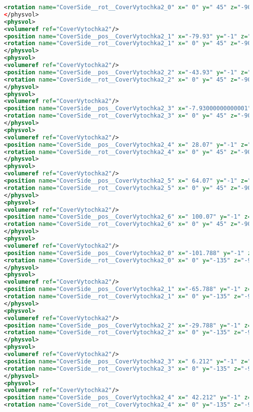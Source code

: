 \begin{lstlisting}[language=XML, firstline=1, lastline=89]
<rotation name="CoverSide__rot__CoverVytochka2_0" x=" 0" y=" 45" z="-90" unit="deg"/>
</physvol>
<physvol>
<volumeref ref="CoverVytochka2"/>
<position name="CoverSide__pos__CoverVytochka2_1" x="-79.93" y="-1" z=" 25.928" unit="mm"/>
<rotation name="CoverSide__rot__CoverVytochka2_1" x=" 0" y=" 45" z="-90" unit="deg"/>
</physvol>
<physvol>
<volumeref ref="CoverVytochka2"/>
<position name="CoverSide__pos__CoverVytochka2_2" x="-43.93" y="-1" z=" 25.928" unit="mm"/>
<rotation name="CoverSide__rot__CoverVytochka2_2" x=" 0" y=" 45" z="-90" unit="deg"/>
</physvol>
<physvol>
<volumeref ref="CoverVytochka2"/>
<position name="CoverSide__pos__CoverVytochka2_3" x="-7.93000000000001" y="-1" z=" 25.928" unit="mm"/>
<rotation name="CoverSide__rot__CoverVytochka2_3" x=" 0" y=" 45" z="-90" unit="deg"/>
</physvol>
<physvol>
<volumeref ref="CoverVytochka2"/>
<position name="CoverSide__pos__CoverVytochka2_4" x=" 28.07" y="-1" z=" 25.928" unit="mm"/>
<rotation name="CoverSide__rot__CoverVytochka2_4" x=" 0" y=" 45" z="-90" unit="deg"/>
</physvol>
<physvol>
<volumeref ref="CoverVytochka2"/>
<position name="CoverSide__pos__CoverVytochka2_5" x=" 64.07" y="-1" z=" 25.928" unit="mm"/>
<rotation name="CoverSide__rot__CoverVytochka2_5" x=" 0" y=" 45" z="-90" unit="deg"/>
</physvol>
<physvol>
<volumeref ref="CoverVytochka2"/>
<position name="CoverSide__pos__CoverVytochka2_6" x=" 100.07" y="-1" z=" 25.928" unit="mm"/>
<rotation name="CoverSide__rot__CoverVytochka2_6" x=" 0" y=" 45" z="-90" unit="deg"/>
</physvol>
<physvol>
<volumeref ref="CoverVytochka2"/>
<position name="CoverSide__pos__CoverVytochka2_0" x="-101.788" y="-1" z=" 10.786" unit="mm"/>
<rotation name="CoverSide__rot__CoverVytochka2_0" x=" 0" y="-135" z="-90" unit="deg"/>
</physvol>
<physvol>
<volumeref ref="CoverVytochka2"/>
<position name="CoverSide__pos__CoverVytochka2_1" x="-65.788" y="-1" z=" 10.786" unit="mm"/>
<rotation name="CoverSide__rot__CoverVytochka2_1" x=" 0" y="-135" z="-90" unit="deg"/>
</physvol>
<physvol>
<volumeref ref="CoverVytochka2"/>
<position name="CoverSide__pos__CoverVytochka2_2" x="-29.788" y="-1" z=" 10.786" unit="mm"/>
<rotation name="CoverSide__rot__CoverVytochka2_2" x=" 0" y="-135" z="-90" unit="deg"/>
</physvol>
<physvol>
<volumeref ref="CoverVytochka2"/>
<position name="CoverSide__pos__CoverVytochka2_3" x=" 6.212" y="-1" z=" 10.786" unit="mm"/>
<rotation name="CoverSide__rot__CoverVytochka2_3" x=" 0" y="-135" z="-90" unit="deg"/>
</physvol>
<physvol>
<volumeref ref="CoverVytochka2"/>
<position name="CoverSide__pos__CoverVytochka2_4" x=" 42.212" y="-1" z=" 10.786" unit="mm"/>
<rotation name="CoverSide__rot__CoverVytochka2_4" x=" 0" y="-135" z="-90" unit="deg"/>

\end{lstlisting}
